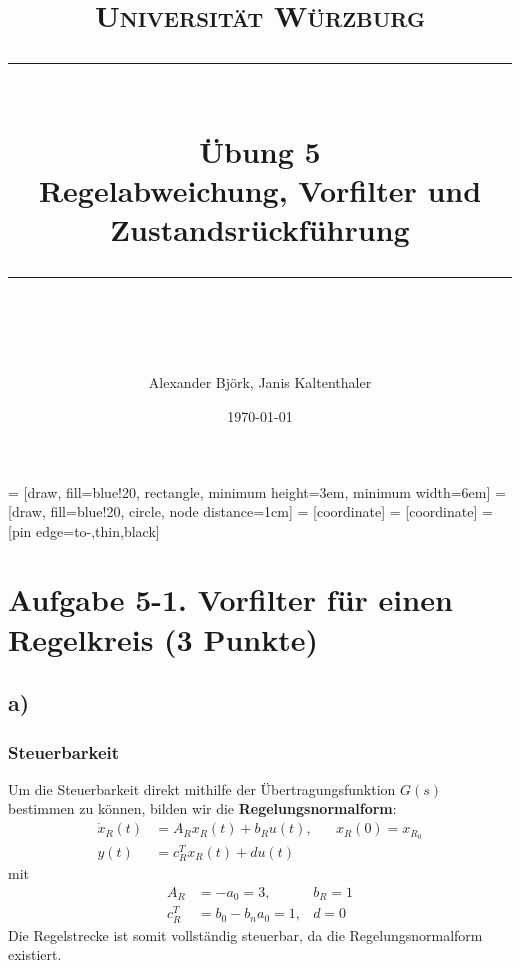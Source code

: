 \documentclass[11pt]{scrartcl} %
\title{	
	\normalfont\normalsize
	\textsc{Universität Würzburg}\\ %
	\vspace{25pt} %
	\rule{\linewidth}{0.5pt}\\ %
	\vspace{20pt} %
	{\huge Übung 5}\\ %
	{\Large Regelabweichung, Vorfilter und Zustandsrückführung}\\
	\vspace{12pt} %
	\rule{\linewidth}{2pt}\\ %
	\vspace{12pt} %
}
\author{\LARGE Alexander Björk, Janis Kaltenthaler} %
\date{\normalsize\today} %
\begin{document}
\maketitle %

 = [draw, fill=blue!20, rectangle, 
    minimum height=3em, minimum width=6em]
 = [draw, fill=blue!20, circle, node distance=1cm]
 = [coordinate]
 = [coordinate]
 = [pin edge={to-,thin,black}]
\newcommand{\inte}{$\displaystyle \int$}

\section*{Aufgabe 5-1. Vorfilter für einen Regelkreis (3 Punkte)}
\subsection*{a)}
\subsubsection*{Steuerbarkeit}
Um die Steuerbarkeit direkt mithilfe der Übertragungsfunktion $G(s)$ bestimmen zu können, bilden wir die \textbf{Regelungsnormalform}:
\begin{align*}
	\dot{x}_R(t)&=A_Rx_R(t)+b_Ru(t),\hspace{20pt}x_R(0)=x_{R_0}\\
	y(t)&=c^T_Rx_R(t)+du(t)
\end{align*}
mit
\begin{align*}
	A_R&=-a_0=3,\hspace{10pt}&b_R=1\\
	c^T_R&=b_0-b_na_0=1,&d=0
\end{align*}
Die Regelstrecke ist somit vollständig steuerbar, da die Regelungsnormalform existiert.
\end{document}
